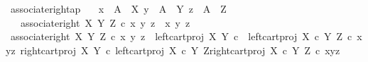 \begin{isabellebody}
\endisatagproof
{\isafoldproof}%
%
\isadelimproof
\isanewline
%
\endisadelimproof
\isanewline
{}\isamarkupfalse%
\ associate{\isacharunderscore}{\kern0pt}right{\isacharunderscore}{\kern0pt}ap{\isacharcolon}{\kern0pt}\isanewline
\ \ \ {\isachardoublequoteopen}x\ {\isacharcolon}{\kern0pt}\ A\ {\isasymrightarrow}\ X{\isachardoublequoteclose}\ {\isachardoublequoteopen}y\ {\isacharcolon}{\kern0pt}\ A\ {\isasymrightarrow}\ Y{\isachardoublequoteclose}\ {\isachardoublequoteopen}z\ {\isacharcolon}{\kern0pt}\ A\ {\isasymrightarrow}\ Z{\isachardoublequoteclose}\isanewline
\ \ \ {\isachardoublequoteopen}associate{\isacharunderscore}{\kern0pt}right\ X\ Y\ Z\ {\isasymcirc}\isactrlsub c\ {\isasymlangle}{\isasymlangle}x{\isacharcomma}{\kern0pt}\ y{\isasymrangle}{\isacharcomma}{\kern0pt}\ z{\isasymrangle}\ {\isacharequal}{\kern0pt}\ {\isasymlangle}x{\isacharcomma}{\kern0pt}\ {\isasymlangle}y{\isacharcomma}{\kern0pt}\ z{\isasymrangle}{\isasymrangle}{\isachardoublequoteclose}\isanewline
%
\isadelimproof
%
\endisadelimproof
%
\isatagproof
{}\isamarkupfalse%
\ {\isacharminus}{\kern0pt}\isanewline
\ \ \isamarkupfalse%
\ {\isachardoublequoteopen}associate{\isacharunderscore}{\kern0pt}right\ X\ Y\ Z\ {\isasymcirc}\isactrlsub c\ {\isasymlangle}{\isasymlangle}x{\isacharcomma}{\kern0pt}\ y{\isasymrangle}{\isacharcomma}{\kern0pt}\ z{\isasymrangle}\ {\isacharequal}{\kern0pt}\ {\isasymlangle}{\isacharparenleft}{\kern0pt}left{\isacharunderscore}{\kern0pt}cart{\isacharunderscore}{\kern0pt}proj\ X\ Y\ {\isasymcirc}\isactrlsub c\ \ left{\isacharunderscore}{\kern0pt}cart{\isacharunderscore}{\kern0pt}proj\ {\isacharparenleft}{\kern0pt}X\ {\isasymtimes}\isactrlsub c\ Y{\isacharparenright}{\kern0pt}\ Z{\isacharparenright}{\kern0pt}\ {\isasymcirc}\isactrlsub c\ {\isasymlangle}{\isasymlangle}x{\isacharcomma}{\kern0pt}y{\isasymrangle}{\isacharcomma}{\kern0pt}z{\isasymrangle}{\isacharcomma}{\kern0pt}\ {\isasymlangle}right{\isacharunderscore}{\kern0pt}cart{\isacharunderscore}{\kern0pt}proj\ X\ Y\ {\isasymcirc}\isactrlsub c\ left{\isacharunderscore}{\kern0pt}cart{\isacharunderscore}{\kern0pt}proj\ {\isacharparenleft}{\kern0pt}X\ {\isasymtimes}\isactrlsub c\ Y{\isacharparenright}{\kern0pt}\ Z{\isacharcomma}{\kern0pt}right{\isacharunderscore}{\kern0pt}cart{\isacharunderscore}{\kern0pt}proj\ {\isacharparenleft}{\kern0pt}X\ {\isasymtimes}\isactrlsub c\ Y{\isacharparenright}{\kern0pt}\ Z{\isasymrangle}\ {\isasymcirc}\isactrlsub c\ {\isasymlangle}{\isasymlangle}x{\isacharcomma}{\kern0pt}y{\isasymrangle}{\isacharcomma}{\kern0pt}z{\isasymrangle}{\isasymrangle}{\isachardoublequoteclose}\isanewline

\end{isabellebody}
